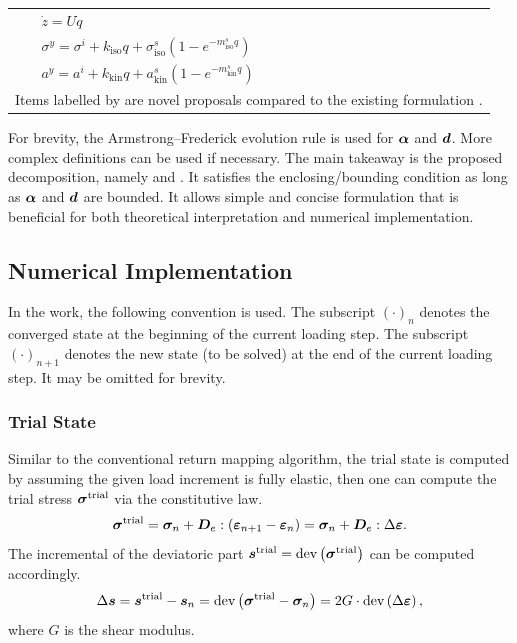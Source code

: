 \begin{table}[htb]
\begin{tabular}{rlll}
                           & \multicolumn{2}{l}{$\dot{z}=U\dot{q}$}                                                                                              &              \\
                           & \multicolumn{2}{l}{$\sigma^y=\sigma^i+k_\text{iso}q+\sigma^s_\text{iso}\left(1-e^{-m^s_\text{iso}q}\right)$}                        &              \\
                           & \multicolumn{2}{l}{$a^y=a^i+k_\text{kin}q+a^s_\text{kin}\left(1-e^{-m^s_\text{kin}q}\right)$}                                       &              \\ \midrule
        \multicolumn{4}{l}{Items labelled by \faLightbulb{} are novel proposals compared to the existing formulation \citep{Hashiguchi2024}.}                                   \\ \bottomrule
    \end{tabular}
\end{table}

For brevity, the Armstrong--Frederick evolution rule is used for $\bm{\alpha}$ and $\bm{d}$.
More complex definitions can be used if necessary.
The main takeaway is the proposed decomposition, namely  and .
It satisfies the enclosing/bounding condition as long as $\bm{\alpha}$ and $\bm{d}$ are bounded.
It allows simple and concise formulation that is beneficial for both theoretical interpretation and numerical implementation.
\subsection{Numerical Implementation}
In the work, the following convention is used.
The subscript $\left(\cdot\right)_n$ denotes the converged state at the beginning of the current loading step.
The subscript $\left(\cdot\right)_{n+1}$ denotes the new state (to be solved) at the end of the current loading step.
It may be omitted for brevity.
\subsubsection{Trial State}
Similar to the conventional return mapping algorithm, the trial state is computed by assuming the given load increment is fully elastic, then one can compute the trial stress $\bm{\sigma}^\text{trial}$ via the constitutive law.
\begin{gather}
    \bm{\sigma}^\text{trial}=\bm{\sigma}_n+\bm{D}_e:\left(\bm{\varepsilon}_{n+1}-\bm{\varepsilon}_n\right)=\bm{\sigma}_n+\bm{D}_e:\Delta\bm{\varepsilon}.
\end{gather}
The incremental of the deviatoric part $\bm{s}^\text{trial}=\text{dev}\left(\bm{\sigma}^\text{trial}\right)$ can be computed accordingly.
\begin{gather}
    \Delta\bm{s}=\bm{s}^\text{trial}-\bm{s}_n=\text{dev}\left(\bm{\sigma}^\text{trial}-\bm{\sigma}_n\right)=2G\cdot\text{dev}\left(\Delta\bm{\varepsilon}\right),
\end{gather}
where $G$ is the shear modulus.
